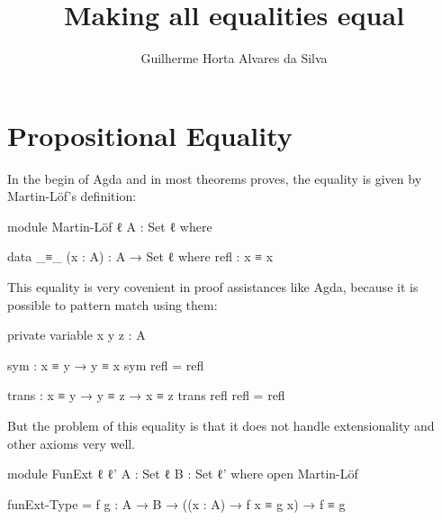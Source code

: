 \documentclass{article}
\author{Guilherme Horta Alvares da Silva}
\title{Making all equalities equal}
\begin{document}


\maketitle

\begin{abstract}

\end{abstract}


\section{Propositional Equality}

In the begin of Agda and in most theorems proves, the equality is given by Martin-Löf's definition:

\begin{code}
module Martin-Löf {ℓ} {A : Set ℓ} where

  data _≡_ (x : A) : A → Set ℓ where
    refl : x ≡ x
\end{code}

This equality is very covenient in proof assistances like Agda, because it is possible to pattern match using them:

\begin{code}
  private variable
    x y z : A

  sym  : x ≡ y → y ≡ x
  sym refl = refl

  trans : x ≡ y → y ≡ z → x ≡ z
  trans refl refl = refl
\end{code}

But the problem of this equality is that it does not handle extensionality and other axioms very well.

\begin{code}
module FunExt {ℓ ℓ'} {A : Set ℓ} {B : Set ℓ'} where
  open Martin-Löf

  funExt-Type = {f g : A → B}
    → ((x : A) → f x ≡ g x) → f ≡ g
\end{code}
\end{document}

